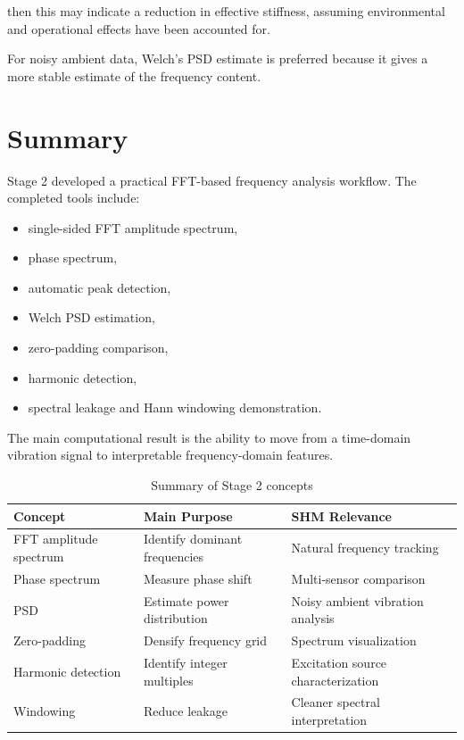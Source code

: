 \documentclass[11pt,a4paper]{article}
\begin{document}
then this may indicate a reduction in effective stiffness, assuming environmental and operational effects have been accounted for.

For noisy ambient data, Welch's PSD estimate is preferred because it gives a more stable estimate of the frequency content.

\section{Summary}

Stage 2 developed a practical FFT-based frequency analysis workflow. The completed tools include:

\begin{itemize}
    \item single-sided FFT amplitude spectrum,
    \item phase spectrum,
    \item automatic peak detection,
    \item Welch PSD estimation,
    \item zero-padding comparison,
    \item harmonic detection,
    \item spectral leakage and Hann windowing demonstration.
\end{itemize}

The main computational result is the ability to move from a time-domain vibration signal to interpretable frequency-domain features.

\begin{table}[H]
\centering
\caption{Summary of Stage 2 concepts}
\begin{tabular}{lll}
\toprule
Concept & Main Purpose & SHM Relevance \\
\midrule
FFT amplitude spectrum & Identify dominant frequencies & Natural frequency tracking \\
Phase spectrum & Measure phase shift & Multi-sensor comparison \\
PSD & Estimate power distribution & Noisy ambient vibration analysis \\
Zero-padding & Densify frequency grid & Spectrum visualization \\
Harmonic detection & Identify integer multiples & Excitation source characterization \\
Windowing & Reduce leakage & Cleaner spectral interpretation \\
\bottomrule
\end{tabular}
\end{table}
\end{document}

